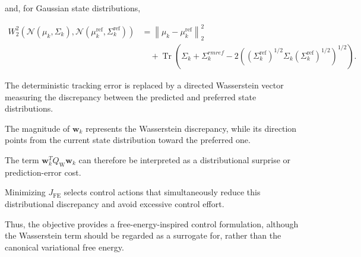 \documentclass[a4paper]{article}
\begin{document}
      and, for Gaussian state distributions,

      \[
      \begin{aligned}
         W_2^2
         \left(
         \mathcal{N}(\mu_k,\Sigma_k),
         \mathcal{N}(\mu_k^{\mathrm{ref}},\Sigma_k^{\mathrm{ref}})
         \right)
         &=
         \left\|
         \mu_k-\mu_k^{\mathrm{ref}}
         \right\|_2^2
         \\
         &\quad+
         \operatorname{Tr}
         \left(
         \Sigma_k+\Sigma_k^{\mathbb{}rm{ref}}
         -
         2
         \left(
         (\Sigma_k^{\mathrm{ref}})^{1/2}
         \Sigma_k
         (\Sigma_k^{\mathrm{ref}})^{1/2}
         \right)^{1/2}
         \right).
      \end{aligned}
      \]

      The deterministic tracking error is replaced by a directed Wasserstein vector measuring the discrepancy between the predicted and preferred state distributions.

      The magnitude of $\mathbf{w}_k$ represents the Wasserstein discrepancy, while its direction points from the current state distribution toward the preferred one.

      The term $\mathbf{w}_k^{T}Q_{\mathrm{W}}\mathbf{w}_k$ can therefore be interpreted as a distributional surprise or prediction-error cost.

      Minimizing $J_{\mathrm{FE}}$ selects control actions that simultaneously reduce this distributional discrepancy and avoid excessive control effort.

      Thus, the objective provides a free-energy-inspired control formulation, although the Wasserstein term should be regarded as a surrogate for, rather than the canonical variational free energy.

      
      
\end{document}
